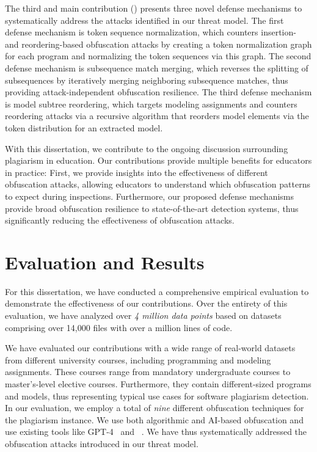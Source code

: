 The third and main contribution () presents three novel defense mechanisms to systematically address the attacks identified in our threat model. The first defense mechanism is token sequence normalization, which counters insertion- and reordering-based obfuscation attacks by creating a token normalization graph for each program and normalizing the token sequences via this graph.
The second defense mechanism is subsequence match merging, which reverses the splitting of subsequences by iteratively merging neighboring subsequence matches, thus providing attack-independent obfuscation resilience.
The third defense mechanism is model subtree reordering, which targets modeling assignments and counters reordering attacks via a recursive algorithm that reorders model elements via the token distribution for an extracted model.

With this dissertation, we contribute to the ongoing discussion surrounding plagiarism in education. Our contributions provide multiple benefits for educators in practice: First, we provide insights into the effectiveness of different obfuscation attacks, allowing educators to understand which obfuscation patterns to expect during inspections.
Furthermore, our proposed defense mechanisms provide broad obfuscation resilience to state-of-the-art detection systems, thus significantly reducing the effectiveness of obfuscation attacks.

\section{Evaluation and Results}
For this dissertation, we have conducted a comprehensive empirical evaluation to demonstrate the effectiveness of our contributions.
Over the entirety of this evaluation, we have analyzed over \textit{4 million data points} based on datasets comprising over 14,000 files with over a million lines of code.

We have evaluated our contributions with a wide range of real-world datasets~\cite{paiva2023, Ljubovic2020a, Saglam2024b} from different university courses, including programming and modeling assignments. These courses range from mandatory undergraduate courses to master's-level elective courses. Furthermore, they contain different-sized programs and models, thus representing typical use cases for software plagiarism detection.
In our evaluation, we employ a total of \textit{nine} different obfuscation techniques for the plagiarism instance.
We use both algorithmic and AI-based obfuscation and use existing tools like GPT-4~\cite{gpt4} and \mossad~\cite{DevoreMcDonald2020}.
We have thus systematically addressed the obfuscation attacks introduced in our threat model.

